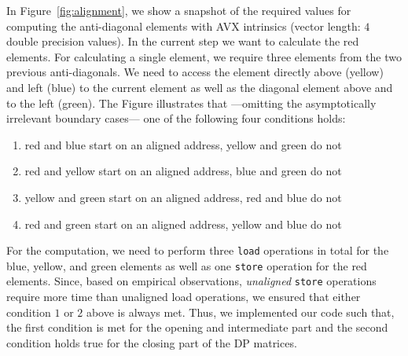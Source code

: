 \documentclass[runningheads,a4paper]{llncs}
\begin{document}
In Figure~\ref{fig:alignment}, we show a snapshot of the required values for computing the anti-diagonal elements with AVX intrinsics (vector length: $4$ double precision values). 
In the current step we want to calculate the red elements. 
For calculating a single element, we require three elements from the two previous anti-diagonals. 
We need to access the element directly above (yellow) and left (blue) to the current element as well as the diagonal element above and to the left  (green). 
The Figure illustrates that ---omitting the asymptotically irrelevant boundary cases--- one of the following four conditions holds:
\begin{enumerate}
  \item red and blue start on an aligned address, yellow and green do not
  \item red and yellow start on an aligned address, blue and green do not
  \item yellow and green start on an aligned address, red and blue do not
  \item red and green start on an aligned address, yellow and blue do not
\end{enumerate}

For the computation, we need to perform three \texttt{load} operations in total for the blue, yellow, and green elements as well as one \texttt{store} operation for the red elements. 
Since, based on empirical observations, {\em unaligned} \texttt{store} operations require more time than unaligned load operations, 
we ensured that either condition $1$ or $2$ above is always met. 
Thus, we implemented our code such that, the first condition is met for the opening and intermediate part and the second condition holds true for the closing part of the DP matrices.


\end{document}
